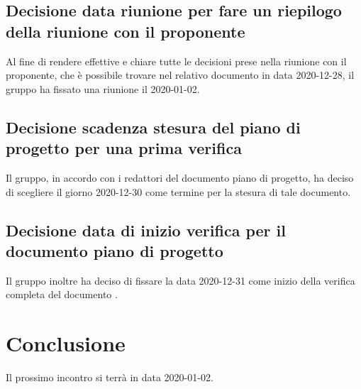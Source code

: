 \subsection{Decisione data riunione per fare un riepilogo della riunione con il proponente}
Al fine di rendere effettive e chiare tutte le decisioni prese nella riunione con il proponente, che è possibile trovare nel relativo documento in data 2020-12-28, il gruppo ha fissato una riunione il 2020-01-02.

\subsection{Decisione scadenza stesura del piano di progetto per una prima verifica}
Il gruppo, in accordo con i redattori del documento piano di progetto, ha deciso di scegliere il giorno 2020-12-30 come termine per la stesura di tale documento.

\subsection{Decisione data di inizio verifica per il documento piano di progetto} 
Il gruppo inoltre ha deciso di fissare la data 2020-12-31 come inizio della verifica completa del documento .

\section{Conclusione}
Il prossimo incontro si terrà in data 2020-01-02.
